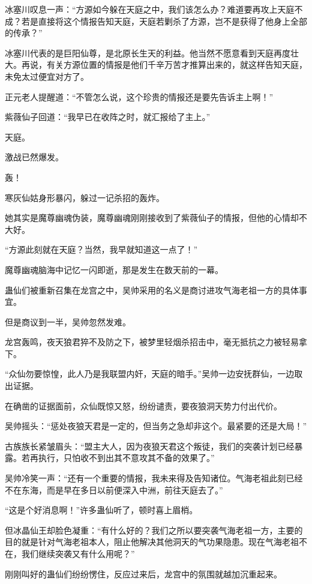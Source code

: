 \begin{this_body}
冰塞川叹息一声：“方源如今躲在天庭之中，我们该怎么办？难道要再攻上天庭不成？若是直接将这个情报告知天庭，天庭若剿杀了方源，岂不是获得了他身上全部的传承？”

冰塞川代表的是巨阳仙尊，是北原长生天的利益。他当然不愿意看到天庭再度壮大。再说，有关方源位置的情报是他们千辛万苦才推算出来的，就这样告知天庭，未免太过便宜对方了。

正元老人提醒道：“不管怎么说，这个珍贵的情报还是要先告诉主上啊！”

紫薇仙子回道：“我早已在收阵之时，就汇报给了主上。”

天庭。

激战已然爆发。

轰！

寒灰仙姑身形暴闪，躲过一记杀招的轰炸。

她其实是魔尊幽魂伪装，魔尊幽魂刚刚接收到了紫薇仙子的情报，但他的心情却不大好。

“方源此刻就在天庭？当然，我早就知道这一点了！”

魔尊幽魂脑海中记忆一闪即逝，那是发生在数天前的一幕。

蛊仙们被重新召集在龙宫之中，吴帅采用的名义是商讨进攻气海老祖一方的具体事宜。

但是商议到一半，吴帅忽然发难。

龙宫轰鸣，夜天狼君猝不及防之下，被梦里轻烟杀招击中，毫无抵抗之力被轻易拿下。

“众仙勿要惊惶，此人乃是我联盟内奸，天庭的暗手。”吴帅一边安抚群仙，一边取出证据。

在确凿的证据面前，众仙既惊又怒，纷纷谴责，要夜狼洞天势力付出代价。

吴帅摇头：“惩处夜狼天君是一定的，但当务之急却非这个。最紧要的还是大局！”

古族族长紧皱眉头：“盟主大人，因为夜狼天君这个叛徒，我们的突袭计划已经暴露。若再执行，只怕收不到出其不意攻其不备的效果了。”

吴帅冷笑一声：“还有一个重要的情报，我未来得及告知诸位。气海老祖此刻已经不在东海，而是早在多日以前便深入中洲，前往天庭去了。”

“这是个好消息啊！”许多蛊仙听了，顿时喜上眉梢。

但冰晶仙王却脸色凝重：“有什么好的？我们之所以要突袭气海老祖一方，主要的目的就是针对气海老祖本人，阻止他解决其他洞天的气功果隐患。现在气海老祖不在，我们继续突袭又有什么用呢？”

刚刚叫好的蛊仙们纷纷愣住，反应过来后，龙宫中的氛围就越加沉重起来。


\end{this_body}
